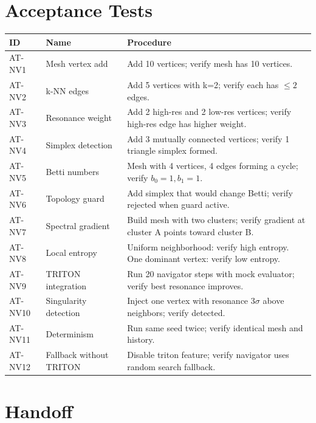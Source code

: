 \documentclass[11pt,a4paper,twoside]{article}
\theoremstyle{definition}
\theoremstyle{plain}
\theoremstyle{remark}
\begin{document}
\part{Acceptance Tests}\label{part:tests}

\begin{longtable}{l l p{5.5cm}}
\toprule
\textbf{ID} & \textbf{Name} & \textbf{Procedure} \\
\midrule
\endfirsthead \midrule \endhead \bottomrule \endfoot
AT-NV1 & Mesh vertex add & Add 10 vertices; verify mesh has 10
  vertices. \\
AT-NV2 & k-NN edges & Add 5 vertices with k=2; verify each has
  $\le 2$ edges. \\
AT-NV3 & Resonance weight & Add 2 high-res and 2 low-res vertices;
  verify high-res edge has higher weight. \\
AT-NV4 & Simplex detection & Add 3 mutually connected vertices;
  verify 1 triangle simplex formed. \\
AT-NV5 & Betti numbers & Mesh with 4 vertices, 4 edges forming a
  cycle; verify $b_0=1, b_1=1$. \\
AT-NV6 & Topology guard & Add simplex that would change Betti;
  verify rejected when guard active. \\
AT-NV7 & Spectral gradient & Build mesh with two clusters; verify
  gradient at cluster A points toward cluster B. \\
AT-NV8 & Local entropy & Uniform neighborhood: verify high entropy.
  One dominant vertex: verify low entropy. \\
AT-NV9 & TRITON integration & Run 20 navigator steps with mock
  evaluator; verify best resonance improves. \\
AT-NV10 & Singularity detection & Inject one vertex with resonance
  3$\sigma$ above neighbors; verify detected. \\
AT-NV11 & Determinism & Run same seed twice; verify identical
  mesh and history. \\
AT-NV12 & Fallback without TRITON & Disable triton feature; verify
  navigator uses random search fallback. \\
\end{longtable}


\part{Handoff}\label{part:handoff}
\end{document}
